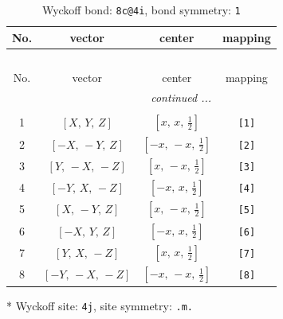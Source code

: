 \documentclass[fleqn,8pt]{jsarticle}
\begin{document}
\renewcommand{\arraystretch}{1.2}
\begin{longtable}{cccc}
\caption{Wyckoff bond: {\tt 8c@4i}, bond symmetry: {\tt 1}}
 \\
 \hline \hline
No. & vector & center & mapping \\ \hline \endfirsthead

\multicolumn{3}{l}{\tablename\ \thetable{}} \\
 \hline \hline
No. & vector & center & mapping \\ \hline \endhead

 \hline \hline
\multicolumn{3}{r}{\footnotesize\it continued ...} \\ \endfoot

 \hline \hline
\multicolumn{3}{r}{} \\ \endlastfoot

1 & $\left[ X,\, Y,\, Z \right]$ & $\left[ x,\, x,\, \frac{1}{2} \right]$ & {\tt [1]} \\ \hline
2 & $\left[ - X,\, - Y,\, Z \right]$ & $\left[ - x,\, - x,\, \frac{1}{2} \right]$ & {\tt [2]} \\ \hline
3 & $\left[ Y,\, - X,\, - Z \right]$ & $\left[ x,\, - x,\, \frac{1}{2} \right]$ & {\tt [3]} \\ \hline
4 & $\left[ - Y,\, X,\, - Z \right]$ & $\left[ - x,\, x,\, \frac{1}{2} \right]$ & {\tt [4]} \\ \hline
5 & $\left[ X,\, - Y,\, Z \right]$ & $\left[ x,\, - x,\, \frac{1}{2} \right]$ & {\tt [5]} \\ \hline
6 & $\left[ - X,\, Y,\, Z \right]$ & $\left[ - x,\, x,\, \frac{1}{2} \right]$ & {\tt [6]} \\ \hline
7 & $\left[ Y,\, X,\, - Z \right]$ & $\left[ x,\, x,\, \frac{1}{2} \right]$ & {\tt [7]} \\ \hline
8 & $\left[ - Y,\, - X,\, - Z \right]$ & $\left[ - x,\, - x,\, \frac{1}{2} \right]$ & {\tt [8]} \\
\end{longtable}
* Wyckoff site: {\tt 4j}, site symmetry: {\tt .m.}
\renewcommand{\arraystretch}{1.2}
\end{document}
